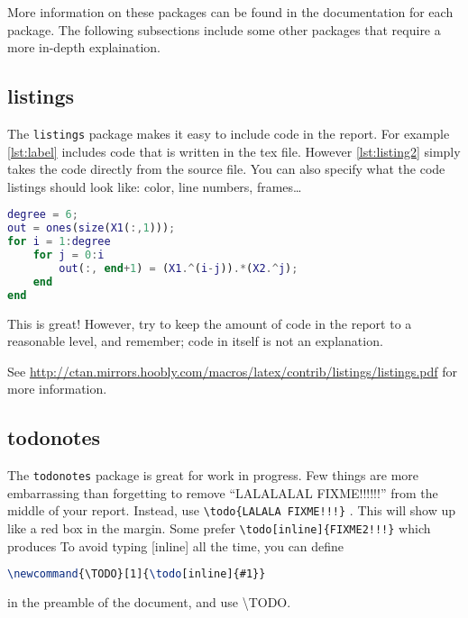 More information on these packages can be found in the documentation for each package. The following subsections include some other packages that require a more in-depth explaination.

\subsection{listings}
The \texttt{listings} package makes it easy to include code in the report. For example \cref{lst:label} includes code that is written in the tex file. However \cref{lst:listing2} simply takes the code directly from the source file. You can also specify what the code listings should look like: color, line numbers, frames\ldots

\begin{lstlisting}[caption={Some Matlab code, with the source in the tex file},label={lst:label},language=Matlab, float]
degree = 6;
out = ones(size(X1(:,1)));
for i = 1:degree
    for j = 0:i
        out(:, end+1) = (X1.^(i-j)).*(X2.^j);
    end
end
\end{lstlisting}

This is great! However, try to keep the amount of code in the report to a reasonable level, and remember; code in itself is not an explanation.

See \url{http://ctan.mirrors.hoobly.com/macros/latex/contrib/listings/listings.pdf} for more information.

\subsection{todonotes}
The \texttt{todonotes} package is great for work in progress. Few things are more embarrassing than forgetting to remove ``LALALALAL FIXME!!!!!!'' from the middle of your report. Instead, use \texttt{\textbackslash todo\{LALALA FIXME!!!\}} . This will show up like a red box in the margin. Some prefer \texttt{\textbackslash todo{[inline]}\{FIXME2!!!\}} which produces  To avoid typing [inline] all the time, you can define
\begin{lstlisting}[language=TeX, numbers=none]
\newcommand{\TODO}[1]{\todo[inline]{#1}}
\end{lstlisting}

in the preamble of the document, and use \textbackslash TODO.

